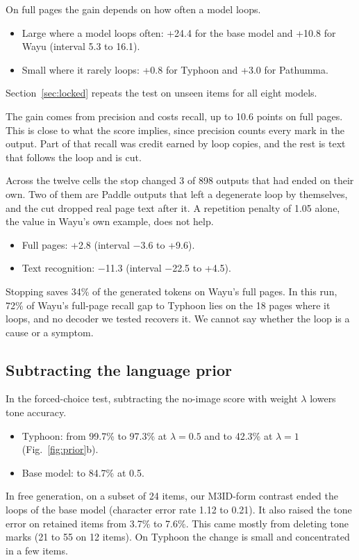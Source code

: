 On full pages the gain depends on how often a model loops.
\begin{itemize}
\item Large where a model loops often: +24.4 for the base model and +10.8 for Wayu (interval 5.3 to 16.1).
\item Small where it rarely loops: +0.8 for Typhoon and +3.0 for Pathumma.
\end{itemize}
Section~\ref{sec:locked} repeats the test on unseen items for all eight models.

The gain comes from precision and costs recall, up to 10.6 points on full pages. This is close to what the score implies, since precision counts every mark in the output. Part of that recall was credit earned by loop copies, and the rest is text that follows the loop and is cut.

Across the twelve cells the stop changed 3 of 898 outputs that had ended on their own. Two of them are Paddle outputs that left a degenerate loop by themselves, and the cut dropped real page text after it. A repetition penalty of 1.05 alone, the value in Wayu's own example, does not help.
\begin{itemize}
\item Full pages: +2.8 (interval $-$3.6 to +9.6).
\item Text recognition: $-$11.3 (interval $-$22.5 to +4.5).
\end{itemize}

Stopping saves 34\% of the generated tokens on Wayu's full pages. In this run, 72\% of Wayu's full-page recall gap to Typhoon lies on the 18 pages where it loops, and no decoder we tested recovers it. We cannot say whether the loop is a cause or a symptom.

\subsection{Subtracting the language prior}
In the forced-choice test, subtracting the no-image score with weight $\lambda$ lowers tone accuracy.
\begin{itemize}
\item Typhoon: from 99.7\% to 97.3\% at $\lambda=0.5$ and to 42.3\% at $\lambda=1$ (Fig.~\ref{fig:prior}b).
\item Base model: to 84.7\% at 0.5.
\end{itemize}
In free generation, on a subset of 24 items, our M3ID-form contrast ended the loops of the base model (character error rate 1.12 to 0.21). It also raised the tone error on retained items from 3.7\% to 7.6\%. This came mostly from deleting tone marks (21 to 55 on 12 items). On Typhoon the change is small and concentrated in a few items.

